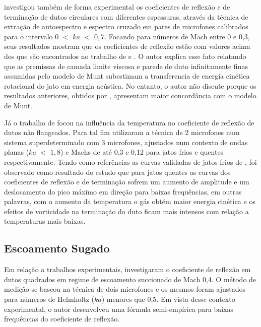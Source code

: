  investigou também de forma experimental os coeficientes de reflexão e de terminação de dutos circulares com diferentes espessuras, através da técnica de extração de autoespectro e espectro cruzado em pares de microfones calibrados para o intervalo $0$ $<$ $ka$ $<$ $0,7$. Focando para números de Mach entre 0 e 0,3, seus resultados mostram que os coeficientes de reflexão estão com valores acima dos que são encontrados no trabalho de  e . O autor explica esse fato relatando que as premissas de camada limite viscosa e parede de duto infinitamente finas assumidas pelo modelo de Munt subestimam a transferencia de energia cinética rotacional do jato em energia acústica. No entanto, o autor não discute porque os resultados anteriores, obtidos por , apresentam maior concordância com o modelo de Munt. 


Já o trabalho de  focou na influência da temperatura no coeficiente de reflexão de dutos não flangeados. Para tal fim utilizaram a técnica de 2 microfones num sistema superdeterminado com 3 microfones, ajustados num contexto de ondas planas ($ka$ $<$ $1,8$) e Machs de até 0,3 e 0,12 para jatos frios e quentes respectivamente. Tendo como referências as curvas validadas de jatos frios de , foi observado como resultado do estudo que para jatos quentes as curvas dos coeficientes de reflexão e de terminação sofrem um aumento de amplitude e um deslocamento do pico máximo em direção para baixas frequências, em outras palavras, com o aumento da temperatura o gás obtém maior energia cinética e os efeitos de vorticidade na terminação do duto ficam mais intensos com relação a temperaturas mais baixas.



\subsection{Escoamento Sugado}

Em relação a trabalhos experimentais,  investigaram o coeficiente de reflexão em dutos quadrados em regime de escoamento succionado de Mach 0,4. O método de medição se baseou na técnica de dois microfones e os mesmos foram ajustados para números de Helmholtz ($ka$) menores que 0,5. Em vista desse contexto experimental, o autor desenvolveu uma fórmula semi-empírica para baixas frequências do coeficiente de reflexão.

